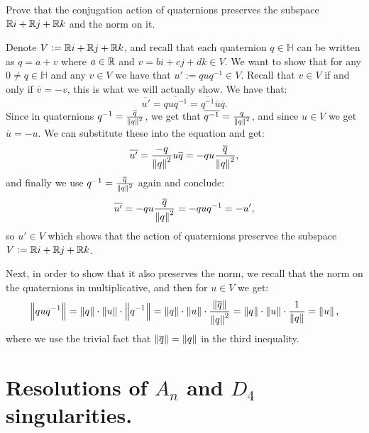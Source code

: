 \documentclass[11pt, a4paper]{article}
\begin{document}
\begin{exercise}
  Prove that the conjugation action of quaternions preserves the subspace
  $\mathbb{R} i + \mathbb{R} j + \mathbb{R} k$ and the norm on it.
\end{exercise}
\begin{solution}
  Denote $V := \mathbb{R} i + \mathbb{R} j + \mathbb{R} k$,
  and recall that each quaternion $q \in \mathbb H$ can be written as
  $q = a + v$ where $a \in \mathbb{R}$ and $v = bi + cj + dk \in V$.
  We want to show that for any $0 \neq q \in \mathbb H$ and any $v \in V$
  we have that $u' := q u q^{-1} \in V$.
  Recall that $v \in V$ if and only if $\bar v = -v$, this is what we will
  actually show.
  We have that:
  \[
    \overline{u'} =
    \overline{q u q^{-1}} =
    \overline{q^{-1}} \overline u \overline{q}.
  \]
  Since in quaternions $q^{-1} = \frac{\overline q}{\left\lVert q\right\rVert^2}$,
  we get that $\overline{q^{-1}} = \frac{q}{\left\lVert q\right\rVert^2}$,
  and since $u \in V$ we get $\overline u = -u$.
  We can substitute these into the equation and get:
  \[
    \overline{u'} =
    \frac{-q}{\left\lVert q\right\rVert^2} u \overline{q} =
    - q u \frac{\overline{q}}{\left\lVert q\right\rVert^2},
  \]
  and finally we use $q^{-1} = \frac{\overline q}{\left\lVert q\right\rVert^2}$ again and conclude:
  \[
    \overline{u'} =
    - q u \frac{\overline{q}}{\left\lVert q\right\rVert^2} =
    - q u q^{-1} = -u',
  \]
  so $u' \in V$ which shows that the
  action of quaternions preserves the subspace $V := \mathbb{R} i + \mathbb{R} j + \mathbb{R} k$.

  Next, in order to show that it also preserves the norm,
  we recall that the norm on the quaternions in multiplicative,
  and then for $u \in V$ we get:
  \[
    \left\lVert q u q^{-1}\right\rVert =
    \left\lVert q\right\rVert \cdot \left\lVert u\right\rVert \cdot \left\lVert q^{-1}\right\rVert =
    \left\lVert q\right\rVert \cdot \left\lVert u\right\rVert \cdot \frac{\left\lVert\overline{q}\right\rVert}{\left\lVert q\right\rVert^2} =
    \left\lVert q\right\rVert \cdot \left\lVert u\right\rVert \cdot \frac{1}{\left\lVert q\right\rVert} = \left\lVert u\right\rVert,
  \]
  where we use the trivial fact that $\left\lVert\overline{q}\right\rVert = \left\lVert q\right\rVert$
  in the third inequality.
\end{solution}

\newpage

\section{Resolutions of \texorpdfstring{$A_n$}{An}
  and \texorpdfstring{$D_4$}{Dfour} singularities.}
\end{document}
